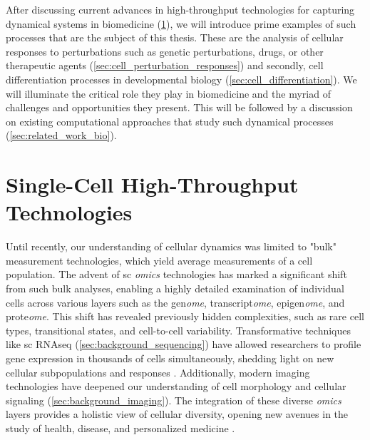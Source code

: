 After discussing current advances in high-throughput technologies for capturing dynamical systems in biomedicine (\cref{sec:tech_background}), we will introduce prime examples of such processes that are the subject of this thesis. 
These are the analysis of cellular responses to perturbations such as genetic perturbations, drugs, or other therapeutic agents (\cref{sec:cell_perturbation_responses}) and secondly, cell differentiation processes in developmental biology (\cref{sec:cell_differentiation}). We will illuminate the critical role they play in biomedicine and the myriad of challenges and opportunities they present. 
This will be followed by a discussion on existing computational approaches that study such dynamical processes (\cref{sec:related_work_bio}).


\section{Single-Cell High-Throughput Technologies}
\label{sec:tech_background}

Until recently, our understanding of cellular dynamics was limited to "bulk" measurement technologies, which yield average measurements of a cell population.
The advent of \acrfull{sc} \textit{omics} technologies has marked a significant shift from such bulk analyses, enabling a highly detailed examination of individual cells across various layers such as the gen\textit{ome}, transcript\textit{ome}, epigen\textit{ome}, and prote\textit{ome}.
This shift has revealed previously hidden complexities, such as rare cell types, transitional states, and cell-to-cell variability. Transformative techniques like \acrlong{sc} \acrfull{RNAseq} (\cref{sec:background_sequencing}) have allowed researchers to profile gene expression in thousands of cells simultaneously, shedding light on new cellular subpopulations and responses \citep{jia2022high}.
Additionally, modern imaging technologies have deepened our understanding of cell morphology and cellular signaling (\cref{sec:background_imaging}). 
The integration of these diverse \textit{omics} layers provides a holistic view of cellular diversity, opening new avenues in the study of health, disease, and personalized medicine \citep{baysoy2023technological}.


